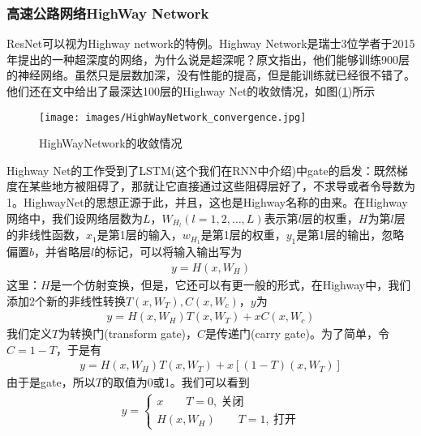         \subsubsection{高速公路网络HighWay Network}
            \par
            ResNet可以视为Highway network的特例。Highway Network\cite{2015.Rupesh}是瑞士3位学者于2015年提出的一种超深度的网络，为什么说是超深呢？原文\cite{2015.Rupesh}指出，他们能够训练900层的神经网络。虽然只是层数加深，没有性能的提高，但是能训练就已经很不错了。他们还在文中给出了最深达100层的Highway Net的收敛情况，如图(\ref{fig:HighWayNetwork的收敛情况})所示
             \begin{figure}[H]
            \centering
            \texttt{[image: images/HighWayNetwork\_convergence.jpg]}
            \caption{HighWayNetwork的收敛情况}
            \label{fig:HighWayNetwork的收敛情况}
            \end{figure}
            \par
            Highway Net的工作受到了LSTM(这个我们在RNN中介绍)中gate的启发：既然梯度在某些地方被阻碍了，那就让它直接通过这些阻碍层好了，不求导或者令导数为1。HighwayNet的思想正源于此，并且，这也是Highway名称的由来。在Highway网络中，我们设网络层数为$L$，$W_{H_l}(l=1,2,\dots,L)$表示第$l$层的权重，$H$为第$l$层的非线性函数，$x_1$是第1层的输入，$w_{H_1}$是第1层的权重，$y_1$是第1层的输出，忽略偏置$b$，并省略层$l$的标记，可以将输入输出写为
            \begin{align*}
            y = H(x,W_H)
            \end{align*}
            这里：$H$是一个仿射变换，但是，它还可以有更一般的形式，在Highway中，我们添加2个新的非线性转换$T(x,W_T),C(x,W_c)$，$y$为
            \begin{align*}
            y = H(x,W_H)T(x,W_T)+xC(x,W_c)
            \end{align*}
            我们定义$T$为转换门(transform gate)，$C$是传递门(carry gate)。为了简单，令$C = 1-T$，于是有
            \begin{align*}
            y = H(x,W_H)T(x,W_T)+x[(1-T)(x,W_T)]
            \end{align*}
            由于是gate，所以$T$的取值为0或1。我们可以看到
            \begin{align*}
            y =
            \left\{
            \begin{aligned}
            x \qquad T = 0, \ \text{关闭}\\
            H(x,W_H)\qquad T = 1,\ \text{打开}
            \end{aligned}
            \right.
            \end{align*}
